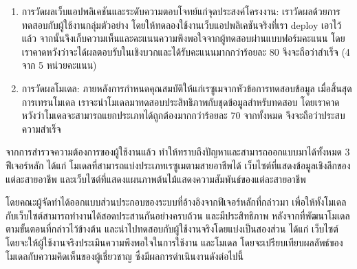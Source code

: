 \begin{enumerate}
    \item การวัดผลเว็บแอปพลิเคชันและระดับความตอบโจทย์แก่จุดประสงค์โครงงาน: เราวัดผลด้วยการทดสอบกับผู้ใช้งานกลุ่มตัวอย่าง โดยให้ทดลองใช้งานเว็บแอปพลิเคชันจริงที่เรา deploy เอาไว้แล้ว จากนั้นจึงเก็บความเห็นและคะแนนความพึงพอใจจากผู้ทดสอบผ่านแบบฟอร์มคะแนน
          โดยเราคาดหวังว่าจะได้ผลตอบรับในเชิงบวกและได้รับคะแนนมากกว่าร้อยละ 80 จึงจะถือว่าสำเร็จ (4 จาก 5 หน่วยคะแนน)
    \item การวัดผลโมเดล: ภายหลังการกำหนดคุณสมบัติให้แก่เรซูเมจากหัวข้อการทดสอบข้อมูล
          เมื่อสิ้นสุดการเทรนโมเดล เราจะนำโมเดลมาทดสอบประสิทธิภาพกับชุดข้อมูลสำหรับทดสอบ โดยเราคาดหวังว่าโมเดลจะสามารถแยกประเภทได้ถูกต้องมากกว่าร้อยละ 70 จากทั้งหมด จึงจะถือว่าประสบความสำเร็จ
\end{enumerate}

\par{
    จากการสำรวจความต้องการของผู้ใช้งานแล้ว ทำให้ทราบถึงปัญหาและสามารถออกแบบมาได้ทั้งหมด 3 ฟีเจอร์หลัก ได้แก่ 
    โมเดลที่สามารถแบ่งประเภทเรซูเมตามสายอาชีพได้ เว็บไซต์ที่แสดงข้อมูลเชิงลึกของแต่ละสายอาชีพ และเว็บไซต์ที่แสดงแผนภาพต้นไม้แสดงความสัมพันธ์ของแต่ละสายอาชีพ
}

\par{
    โดยคณะผู้จัดทำได้ออกแบบส่วนประกอบของระบบที่อ้างอิงจากฟีเจอร์หลักที่กล่าวมา เพื่อให้ทั้งโมเดลกับเว็บไซต์สามารถทำงานได้สอดประสานกันอย่างครบถ้วน 
    และมีประสิทธิภาพ หลังจากที่พัฒนาโมเดลตามขั้นตอนที่กล่าวไว้ข้างต้น และนำไปทดสอบกับผู้ใช้งานจริงโดยแบ่งเป็นสองส่วน ได้แก่ เว็บไซต์ 
    โดยจะให้ผู้ใช้งานจริงประเมินความพึงพอใจในการใช้งาน และโมเดล โดยจะเปรียบเทียบผลลัพธ์ของโมเดลกับความคิดเห็นของผู้เชี่ยวชาญ ซึ่งมีผลการดำเนินงานดังต่อไปนี้
}






